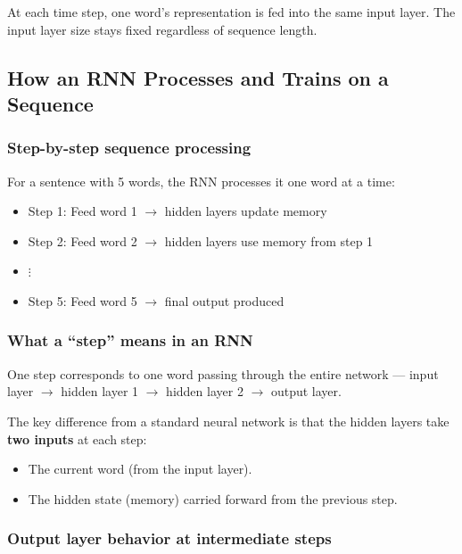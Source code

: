 \documentclass[12pt,a4paper]{article}
\begin{document}
At each time step, one word's representation is fed into the same input layer.
The input layer size stays fixed regardless of sequence length.

\subsection{How an RNN Processes and Trains on a Sequence}

\subsubsection{Step-by-step sequence processing}

For a sentence with 5 words, the RNN processes it one word at a time:
\begin{itemize}
    \item Step 1: Feed word 1 $\to$ hidden layers update memory
    \item Step 2: Feed word 2 $\to$ hidden layers use memory from step 1
    \item $\vdots$
    \item Step 5: Feed word 5 $\to$ final output produced
\end{itemize}

\subsubsection{What a ``step'' means in an RNN}

One step corresponds to one word passing through the entire network --- input layer
$\rightarrow$ hidden layer 1 $\rightarrow$ hidden layer 2 $\rightarrow$ output layer.

The key difference from a standard neural network is that the hidden layers take
\textbf{two inputs} at each step:
\begin{itemize}
    \item The current word (from the input layer).
    \item The hidden state (memory) carried forward from the previous step.
\end{itemize}

\subsubsection{Output layer behavior at intermediate steps}
\end{document}
